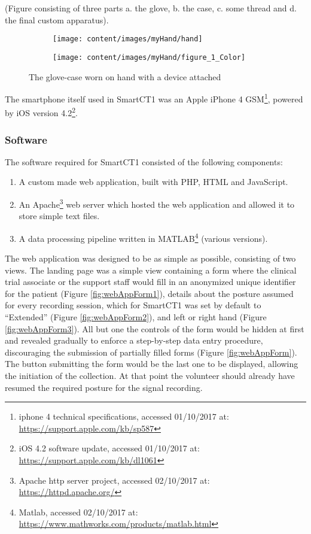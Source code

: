 (\textcolor{BurntOrange}{Figure consisting of three parts a. the glove, b. the case, c. some thread and d. the final custom apparatus}).

\begin{figure}[h]
\centering
\begin{subfigure}{.5\textwidth}
  \centering
  \texttt{[image: content/images/myHand/hand]}
\end{subfigure}%
\begin{subfigure}{.5\textwidth}
  \centering
  \texttt{[image: content/images/myHand/figure\_1\_Color]}
\end{subfigure}
\caption{The glove-case worn on hand with a device attached}
\label{fig:glovCase}
\end{figure}

The smartphone itself used in \gls{SmartCT1} was an Apple iPhone 4 GSM\footnote{iphone 4 technical specifications, accessed 01/10/2017 at: \url{https://support.apple.com/kb/sp587}}, powered by iOS version 4.2\footnote{iOS 4.2 software update, accessed 01/10/2017 at: \url{https://support.apple.com/kb/dl1061}}. 

\subsubsection{Software}
\label{subsubsec:smartCT1Software}
The software required for \gls{SmartCT1} consisted of the following components:

\begin{enumerate}
\item A custom made web application, built with PHP, HTML and JavaScript.
\item An Apache\footnote{Apache http server project, accessed 02/10/2017 at: \url{https://httpd.apache.org/}} web server which hosted the web application and allowed it to store simple text files.
\item A data processing pipeline written in MATLAB\footnote{Matlab, accessed 02/10/2017 at: \url{https://www.mathworks.com/products/matlab.html}} (various versions).
\end{enumerate}

The web application was designed to be as simple as possible, consisting of two views. The landing page was a simple view containing a form where the clinical trial associate or the support staff would fill in an anonymized unique identifier for the patient (Figure \ref{fig:webAppForm1}), details about the posture assumed for every recording session, which for \gls{SmartCT1} was set by default to ``Extended'' (Figure \ref{fig:webAppForm2}), and left or right hand (Figure \ref{fig:webAppForm3}). All but one the controls of the form would be hidden at first and revealed gradually to enforce a step-by-step data entry procedure, discouraging the submission of partially filled forms (Figure \ref{fig:webAppForm}). The button submitting the form would be the last one to be displayed, allowing the initiation of the collection. At that point the volunteer should already have resumed the required posture for the signal recording. 

